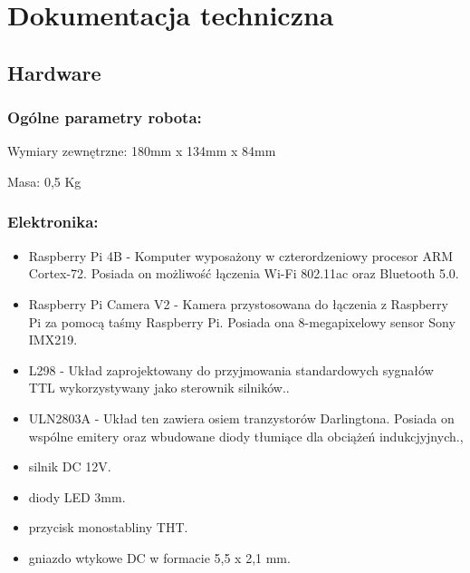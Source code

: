 \section{Dokumentacja techniczna}
\subsection{Hardware}
\subsubsection{Ogólne parametry robota:}
Wymiary zewnętrzne: 180mm x  134mm x 84mm

Masa: 0,5 Kg

\subsubsection{Elektronika:}
    \begin{itemize}
        \item Raspberry Pi 4B - Komputer wyposażony w czterordzeniowy procesor ARM Cortex-72. Posiada on możliwość łączenia Wi-Fi 802.11ac oraz Bluetooth 5.0. \cite{malina}
        \item Raspberry Pi Camera V2 - Kamera przystosowana do łączenia z Raspberry Pi za pomocą taśmy Raspberry Pi. Posiada ona 8-megapixelowy sensor Sony IMX219. \cite{malina}
        \item L298 - Układ zaprojektowany do przyjmowania standardowych sygnałów TTL wykorzystywany jako sterownik silników.\cite{L298}.
        \item ULN2803A - Układ ten zawiera osiem tranzystorów Darlingtona. Posiada on wspólne emitery oraz wbudowane diody tłumiące dla obciążeń indukcjyjnych.\cite{ULN2803a},
        \item silnik DC 12V.
        \item diody LED 3mm.
        \item przycisk monostabliny THT.
        \item gniazdo wtykowe DC w formacie 5,5 x 2,1 mm.
    \end{itemize}

